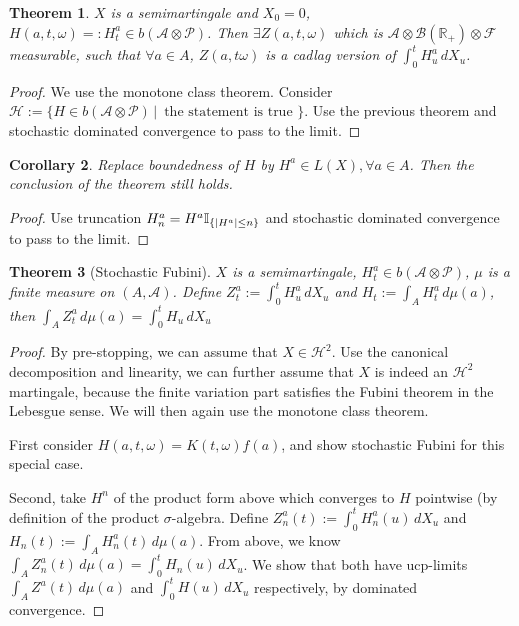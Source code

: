 \documentclass[openany,oneside]{book}
\newtheorem{thm}{Theorem}[section]
\newtheorem{cor}[thm]{Corollary}
\theoremstyle{definition}
\theoremstyle{remark}
\newcommand{\I}{\mathbb{I}} %
\DeclarePairedDelimiter{\abs}{\lvert}{\rvert} %
\newcommand{\sH}[1][2]{\mathcal{H}^{#1}} %
\newcommand{\pred}{\mathcal{P}} %
\begin{document}
\begin{thm}
$X$ is a semimartingale and $X_0=0$, $H(a,t,\omega) =: H^a_t \in b(\mathcal{A}\otimes\pred)$. Then $\exists Z(a,t,\omega)$ which is $\mathcal{A} \otimes \mathcal{B}(\mathbb{R}_+) \otimes \mathcal{F}$ measurable, such that $\forall a\in A$, $Z(a,t\omega)$ is a cadlag version of $\int_0^t H^a_u \,d X_u$.
\end{thm}
\begin{proof}
We use the monotone class theorem. Consider $\mathcal{H}:=\{H\in b(\mathcal{A}\otimes\pred) \,\big\vert\, \textrm{ the statement is true }\}$. Use the previous theorem and stochastic dominated convergence to pass to the limit.
\end{proof}

\begin{cor}
Replace boundedness of $H$ by $H^a \in L(X), \forall a\in A$. Then the conclusion of the theorem still holds.
\end{cor}
\begin{proof}
Use truncation $H^a_n = H^a \I_{\{\abs{H^a} \le n\}}$ and stochastic dominated convergence to pass to the limit.
\end{proof}

\begin{thm}[Stochastic Fubini]
$X$ is a semimartingale, $H^a_t \in b(\mathcal{A}\otimes\pred)$, $\mu$ is a finite measure on $(A,\mathcal{A})$. Define $Z^a_t := \int_0^t H^a_u \,d X_u$ and $H_t := \int_A H^a_t \,d\mu(a)$, then $\int_A Z^a_t \,d\mu(a) = \int_0^t H_u \,d X_u$
\end{thm}
\begin{proof}
By pre-stopping, we can assume that $X\in\sH$. Use the canonical decomposition and linearity, we can further assume that $X$ is indeed an $\sH$ martingale, because the finite variation part satisfies the Fubini theorem in the Lebesgue sense. We will then again use the monotone class theorem.
\par
First consider $H(a,t,\omega)=K(t,\omega)f(a)$, and show stochastic Fubini for this special case.
\par
Second, take $H^n$ of the product form above which converges to $H$ pointwise (by definition of the product $\sigma$-algebra. Define $Z^a_n(t) := \int_0^t H^a_n(u) \,d X_u$ and $H_n(t) := \int_A H^a_n(t) \,d \mu(a)$. From above, we know $\int_A Z^a_n (t) \,d\mu(a) = \int_0^t H_n(u) \,d X_u$. We show that both have ucp-limits $\int_A Z^a(t) \,d\mu(a)$ and $\int_0^t H(u) \,d X_u$ respectively, by dominated convergence.
\end{proof}
\end{document}
